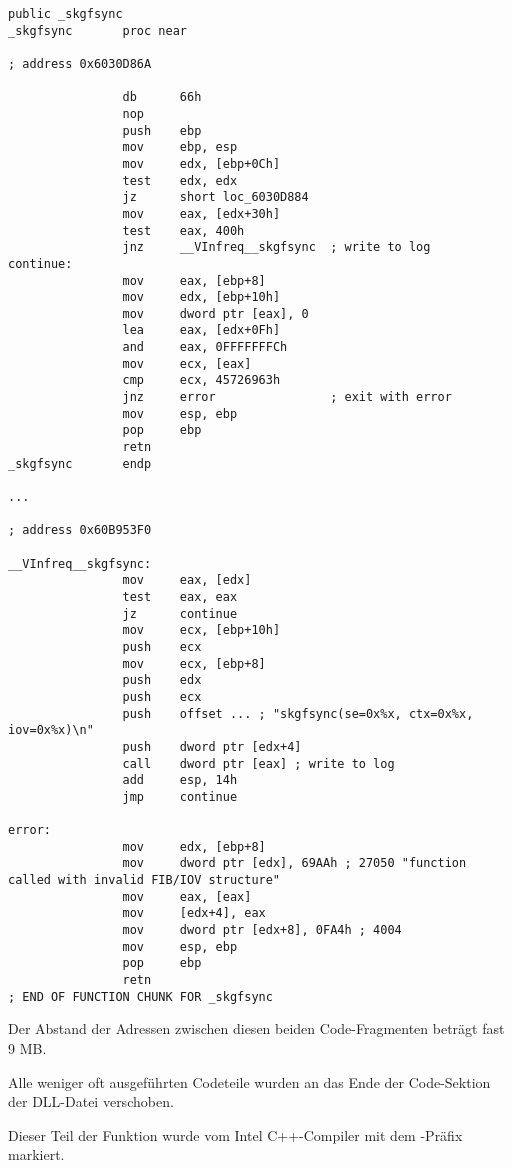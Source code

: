 \begin{lstlisting}[caption=orageneric11.dll (win32),style=customasmx86]
                public _skgfsync
_skgfsync       proc near

; address 0x6030D86A

                db      66h
                nop
                push    ebp
                mov     ebp, esp
                mov     edx, [ebp+0Ch]
                test    edx, edx
                jz      short loc_6030D884
                mov     eax, [edx+30h]
                test    eax, 400h
                jnz     __VInfreq__skgfsync  ; write to log
continue:
                mov     eax, [ebp+8]
                mov     edx, [ebp+10h]
                mov     dword ptr [eax], 0
                lea     eax, [edx+0Fh]
                and     eax, 0FFFFFFFCh
                mov     ecx, [eax]
                cmp     ecx, 45726963h
                jnz     error                ; exit with error
                mov     esp, ebp
                pop     ebp
                retn
_skgfsync       endp

...

; address 0x60B953F0

__VInfreq__skgfsync:
                mov     eax, [edx]
                test    eax, eax
                jz      continue
                mov     ecx, [ebp+10h]
                push    ecx
                mov     ecx, [ebp+8]
                push    edx
                push    ecx
                push    offset ... ; "skgfsync(se=0x%x, ctx=0x%x, iov=0x%x)\n"
                push    dword ptr [edx+4]
                call    dword ptr [eax] ; write to log
                add     esp, 14h
                jmp     continue

error:
                mov     edx, [ebp+8]
                mov     dword ptr [edx], 69AAh ; 27050 "function called with invalid FIB/IOV structure"
                mov     eax, [eax]
                mov     [edx+4], eax
                mov     dword ptr [edx+8], 0FA4h ; 4004
                mov     esp, ebp
                pop     ebp
                retn
; END OF FUNCTION CHUNK FOR _skgfsync
\end{lstlisting}

Der Abstand der Adressen zwischen diesen beiden Code-Fragmenten beträgt fast 9 MB.

Alle weniger oft ausgeführten Codeteile wurden an das Ende der Code-Sektion der
DLL-Datei verschoben.

Dieser Teil der Funktion wurde vom Intel C++-Compiler mit dem -Präfix
markiert.

